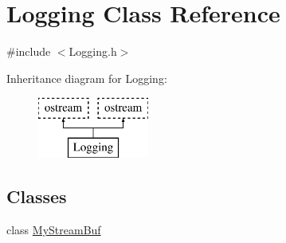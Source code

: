 \hypertarget{classLogging}{\section{Logging Class Reference}
\label{classLogging}
}


{\ttfamily \#include $<$Logging.\-h$>$}

Inheritance diagram for Logging\-:\begin{figure}[H]
\begin{center}
\leavevmode
\includegraphics[height=2.000000cm]{classLogging}
\end{center}
\end{figure}
\subsection*{Classes}
\begin{DoxyCompactItemize}
\item 
class \hyperlink{classLogging_1_1MyStreamBuf}{My\-Stream\-Buf}
\end{DoxyCompactItemize}
